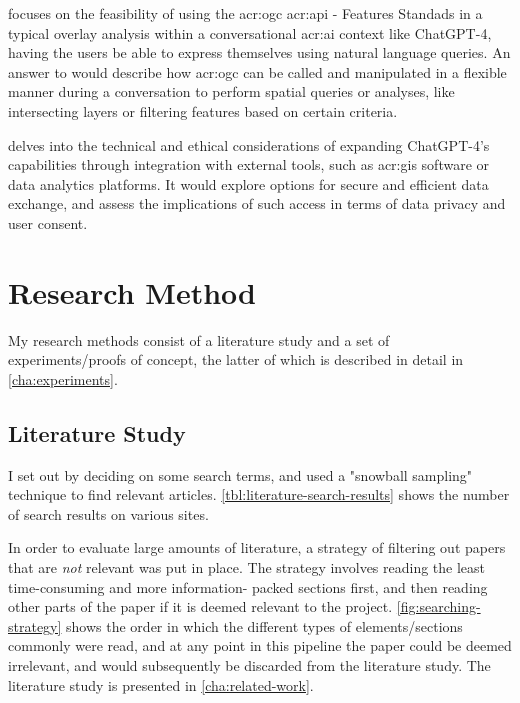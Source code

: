  focuses on the feasibility of using the \acrshort{acr:ogc} \acrshort{acr:api} - Features Standads in a typical overlay analysis within a conversational \acrshort{acr:ai} context like ChatGPT-4, having the users be able to express themselves using natural language queries. An answer to  would describe how \acrshort{acr:ogc}  can be called and manipulated in a flexible manner during a conversation to perform spatial queries or analyses, like intersecting layers or filtering features based on certain criteria.

 delves into the technical and ethical considerations of expanding ChatGPT-4's capabilities through integration with external tools, such as \acrshort{acr:gis} software or data analytics platforms. It would explore options for secure and efficient data exchange, and assess the implications of such access in terms of data privacy and user consent.

\section{Research Method}\label{sec:research-method}

My research methods consist of a literature study and a set of experiments/proofs of concept, the latter of which is described in detail in \autoref{cha:experiments}.

\subsection{Literature Study}\label{subsec:research-method-literature-study}

I set out by deciding on some search terms, and used a "snowball sampling" technique to find relevant articles. \autoref{tbl:literature-search-results} shows the number of search results on various sites.

In order to evaluate large amounts of literature, a strategy of filtering out papers that are \textit{not} relevant was put in place. The strategy involves reading the least time-consuming and more information- packed sections first, and then reading other parts of the paper if it is deemed relevant to the project. \autoref{fig:searching-strategy} shows the order in which the different types of elements/sections commonly were read, and at any point in this pipeline the paper could be deemed irrelevant, and would subsequently be discarded from the literature study. The literature study is presented in \autoref{cha:related-work}.

